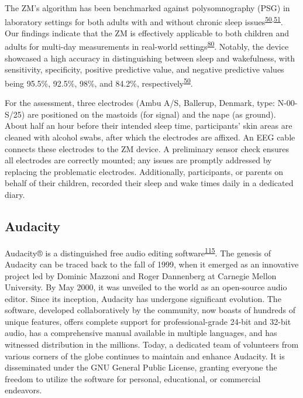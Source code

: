 \documentclass[
  10pt,
]{scrbook}
\begin{document}
The ZM's algorithm has been benchmarked against polysomnography (PSG) in
laboratory settings for both adults with and without chronic sleep
issues\textsuperscript{\protect\hyperlink{ref-kaplan_performance_2014}{50},\protect\hyperlink{ref-wang_evaluation_2015}{51}}.
Our findings indicate that the ZM is effectively applicable to both
children and adults for multi-day measurements in real-world
settings\textsuperscript{\protect\hyperlink{ref-hees_novel_2015}{80}}.
Notably, the device showcased a high accuracy in distinguishing between
sleep and wakefulness, with sensitivity, specificity, positive
predictive value, and negative predictive values being 95.5\%, 92.5\%,
98\%, and 84.2\%,
respectively\textsuperscript{\protect\hyperlink{ref-kaplan_performance_2014}{50}}.

For the assessment, three electrodes (Ambu A/S, Ballerup, Denmark, type:
N-00-S/25) are positioned on the mastoids (for signal) and the nape (as
ground). About half an hour before their intended sleep time,
participants' skin areas are cleaned with alcohol swabs, after which the
electrodes are affixed. An EEG cable connects these electrodes to the ZM
device. A preliminary sensor check ensures all electrodes are correctly
mounted; any issues are promptly addressed by replacing the problematic
electrodes. Additionally, participants, or parents on behalf of their
children, recorded their sleep and wake times daily in a dedicated
diary.

\hypertarget{audacity}{%
\subsection{Audacity}\label{audacity}}

Audacity®️ is a distinguished free audio editing
software\textsuperscript{\protect\hyperlink{ref-audacity}{115}}. The
genesis of Audacity can be traced back to the fall of 1999, when it
emerged as an innovative project led by Dominic Mazzoni and Roger
Dannenberg at Carnegie Mellon University. By May 2000, it was unveiled
to the world as an open-source audio editor. Since its inception,
Audacity has undergone significant evolution. The software, developed
collaboratively by the community, now boasts of hundreds of unique
features, offers complete support for professional-grade 24-bit and
32-bit audio, has a comprehensive manual available in multiple
languages, and has witnessed distribution in the millions. Today, a
dedicated team of volunteers from various corners of the globe continues
to maintain and enhance Audacity. It is disseminated under the GNU
General Public License, granting everyone the freedom to utilize the
software for personal, educational, or commercial endeavors.
\end{document}
